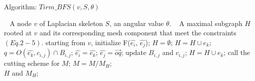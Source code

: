 \begin{algorithm}
\caption{Algorithm: $Tirm\_BFS(v, S,\theta)$}
\label{alg:Framwork}
\begin{algorithmic}[1]
\REQUIRE~
A node $v$ of Laplacian skeleton $S$, an angular value $\theta$.
\ENSURE~
 A maximal subgraph $H$ rooted at $v$ and its corresponding mesh component that meet the constraints $(Eq.2-5)$.
\STATE starting from $v$, initialize F($\hat{e_i}$, $\hat{e_j}$); $H = \emptyset $;
  \STATE  $H = H \cup {e_k}$;
  \ENDIF
  \STATE $q = O( \hat{e_k}, c_{i,j}) \cap B_{i,j}$;
  \STATE  $\hat{e_i}=  \hat{e_k}$;
  \STATE $\hat{e_j} =  \overrightarrow{oq}$;
  \STATE  update $B_{i,j}$ and $c_{i,j}$;
  \STATE  $H = H \cup {e_k}$;
  \ENDIF
\ENDWHILE
\STATE  call the cutting scheme for $M$;
\STATE  $M= M/M_H$;
\label{code:fram:select} \\
\RETURN  $H$ and $M_H$;
\end{algorithmic}
\end{algorithm}

